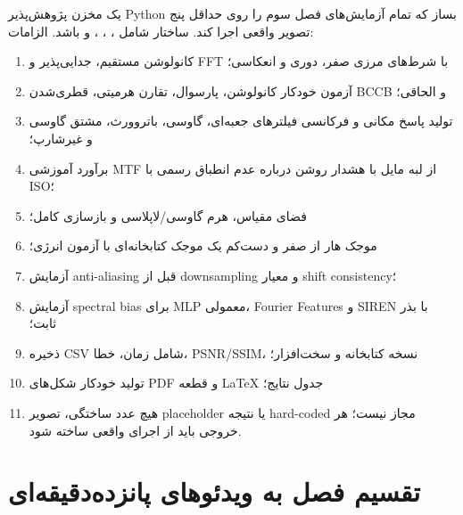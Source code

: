 \begin{workshopbox}
یک مخزن پژوهش‌پذیر Python بساز که تمام آزمایش‌های فصل سوم را روی حداقل پنج تصویر واقعی اجرا کند.
ساختار شامل ، ، ،  و  باشد. الزامات:
\begin{enumerate}
\item کانولوشن مستقیم، جدایی‌پذیر و FFT با شرط‌های مرزی صفر، دوری و انعکاسی؛
\item آزمون خودکار کانولوشن، پارسوال، تقارن هرمیتی، قطری‌شدن BCCB و الحاقی؛
\item تولید پاسخ مکانی و فرکانسی فیلترهای جعبه‌ای، گاوسی، باتروورث، مشتق گاوسی و غیرشارپ؛
\item برآورد آموزشی MTF از لبه مایل با هشدار روشن درباره عدم انطباق رسمی با ISO؛
\item فضای مقیاس، هرم گاوسی/لاپلاسی و بازسازی کامل؛
\item موجک هار از صفر و دست‌کم یک موجک کتابخانه‌ای با آزمون انرژی؛
\item آزمایش anti-aliasing قبل از downsampling و معیار shift consistency؛
\item آزمایش spectral bias برای MLP معمولی، Fourier Features و SIREN با بذر ثابت؛
\item ذخیره CSV شامل زمان، خطا، PSNR/SSIM، نسخه کتابخانه و سخت‌افزار؛
\item تولید خودکار شکل‌های PDF و قطعه LaTeX جدول نتایج؛
\item هیچ عدد ساختگی، تصویر placeholder یا نتیجه hard-coded مجاز نیست؛ هر خروجی باید از اجرای واقعی ساخته شود.
\end{enumerate}
\end{workshopbox}

\section{تقسیم فصل به ویدئوهای پانزده‌دقیقه‌ای}

